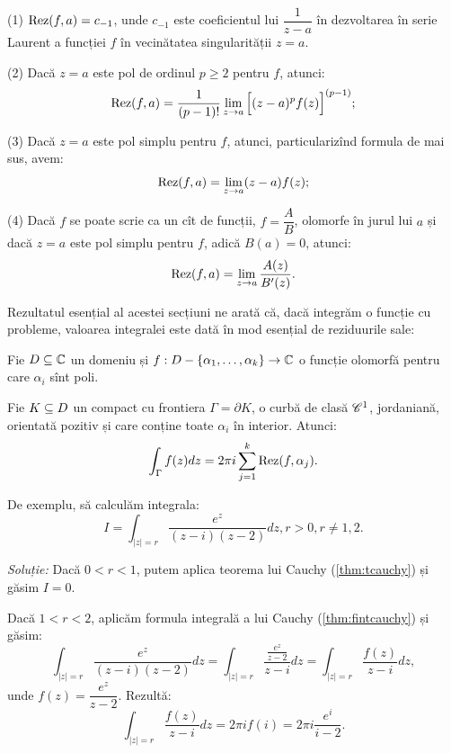 \begin{theorem}\label{thm:calc-rez}
  (1) $ \mathrm{Rez}(f, a) = c_{-1} $, unde $ c_{-1} $ este coeficientul lui $ \dfrac{1}{z-a} $
  în dezvoltarea în serie Laurent a funcției $ f $ în vecinătatea singularității $ z = a $.

  (2) Dacă $ z = a $ este pol de ordinul $ p \geq 2 $ pentru $ f $, atunci:
  \[
    \mathrm{Rez}(f, a) = \dfrac{1}{(p-1)!} \lim_{z \to a} \Big[ (z - a)^p f(z) \Big]^{(p-1)};
  \]

  (3) Dacă $ z = a $ este pol simplu pentru $ f $, atunci, particularizînd formula
  de mai sus, avem:
  \[
    \mathrm{Rez}(f, a) = \lim_{z \to a} (z - a) f(z);
  \]

  (4) Dacă $ f $ se poate scrie ca un cît de funcții, $ f = \dfrac{A}{B} $, olomorfe în
  jurul lui $ a $ și dacă $ z = a $ este pol simplu pentru $ f $, adică $ B(a) = 0 $,
  atunci:
  \[
    \mathrm{Rez}(f, a) = \lim_{z \to a} \dfrac{A(z)}{B'(z)}.
  \]
\end{theorem}

Rezultatul esențial al acestei secțiuni ne arată că, dacă integrăm o funcție
cu probleme, valoarea integralei este dată în mod esențial de reziduurile sale:

\begin{theorem}\label{thm:t-rez}
  Fie $ D \subseteq \mathbb{C} $ un domeniu și $ f : D - \{ \alpha_1, \dots, \alpha_k \} \to \mathbb{C} $ o funcție
  olomorfă pentru care $ \alpha_i $ sînt poli.

  Fie $ K \subseteq D $ un compact cu frontiera $ \Gamma = \partial K $, o curbă de clasă
  $ \mathscr{C}^1 $, jordaniană, orientată pozitiv și care conține toate $ \alpha_i $ în
  interior. Atunci:
  \[
    \int_\Gamma f(z) dz = 2 \pi i \sum_{j = 1}^k \mathrm{Rez}(f, \alpha_j).
  \]
\end{theorem}

De exemplu, să calculăm integrala:
\[
  I = \int_{|z| = r} \frac{e^z}{(z - i)(z - 2)} dz, r > 0, r \neq 1, 2.
\]

\emph{Soluție:} Dacă $ 0 < r < 1 $, putem aplica teorema lui Cauchy (\ref{thm:tcauchy})
și găsim $ I = 0 $.

Dacă $ 1 < r < 2 $, aplicăm formula integrală a lui Cauchy (\ref{thm:fintcauchy}) și găsim:
\[
  \int_{|z| = r} \frac{e^z}{(z - i)(z - 2)} dz = %
  \int_{|z| = r} \frac{\frac{e^z}{z - 2}}{z - i} dz = %
  \int_{|z| = r} \frac{f(z)}{z - i} dz,
\]
unde $ f(z) = \dfrac{e^z}{z - 2} $. Rezultă:
\[
  \int_{|z| = r} \frac{f(z)}{z - i} dz = 2 \pi i f(i) = 2 \pi i \frac{e^i}{i - 2}.
\]

